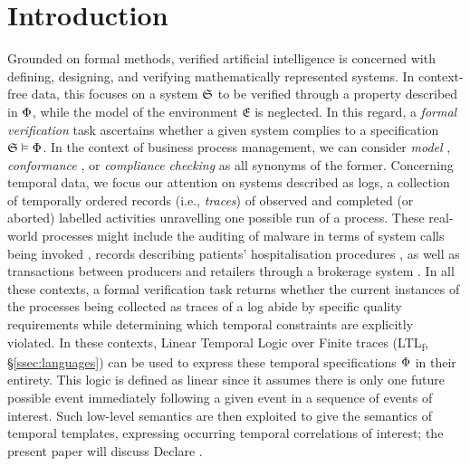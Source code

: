 \documentclass[sigconf]{acmart}
\begin{document}
\section{Introduction}
Grounded on formal methods, verified artificial intelligence \cite{DBLP:journals/cacm/SeshiaSS22} is concerned with defining, designing, and verifying mathematically represented systems. In context-free data, this focuses on a system $\mathfrak{S}$ to be verified through a property described in $\Phi$, while the model of the environment $\mathfrak{E}$ is neglected. In this regard, a \textit{formal verification} task ascertains whether a given system complies to a specification $\mathfrak{S}\vDash \Phi$. 
In the context of business process management, we can consider \textit{model} \cite{DBLP:books/daglib/0020348}, \textit{conformance} \cite{DBLP:conf/bpm/BergamiMMM21}, or \textit{compliance} \cite{DBLP:conf/bpm/AwadDW08,WEIDLICH20111009} \textit{checking} as all synonyms of the former. Concerning temporal data, we focus our attention on systems described as logs, a collection of temporally ordered records (i.e., \textit{traces}) of observed and completed (or aborted) labelled activities unravelling one possible run of a process. These real-world processes might include the auditing of malware in terms of system calls being invoked \cite{10.7717/peerj-cs.346,DBLP:conf/siu/YaziCG19}, records describing patients' hospitalisation procedures  \cite{8782520,XuPYYLZ20,https://doi.org/10.4121/uuid:d9769f3d-0ab0-4fb8-803b-0d1120ffcf54}, as well as transactions between producers and retailers through a brokerage system \cite{DBLP:conf/wbdb/PetermannJMR14}. In all these contexts, a formal verification task returns whether the current instances of the processes being collected as traces of a log abide by specific quality requirements while determining which temporal constraints are explicitly violated. In these contexts, Linear Temporal Logic over Finite traces (LTL\textsubscript{f}, \S\ref{ssec:languages}) \cite{DBLP:conf/ijcai/GiacomoV13} can be used to express these temporal specifications $\Phi$ in their entirety. This logic is defined as linear since it assumes there is only one future possible event immediately following a given event in a sequence of events of interest. Such low-level semantics are then exploited to give the semantics of temporal templates, expressing occurring temporal correlations of interest; the present paper will discuss Declare \cite{4384001}. 
\end{document}
